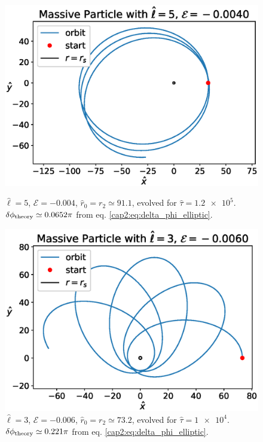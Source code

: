 \begin{figure}[h]
    \begin{minipage}{0.48 \textwidth}
        \centering
        \includegraphics[width=\textwidth]{Figures/chapter2/prec1.eps}
        \caption{$\hat \ell = 5$, $\mathcal E = -0.004$,
        $\hat r_0 = r_2 \simeq 91.1$, evolved for $\hat \tau = \num{1.2e5}$. \\
        $\delta \phi_{\rm theory} \simeq 0.0652 \pi$ from eq.
        \ref{cap2:eq:delta_phi_elliptic}.}
        \label{cap2:fig:prec1}
    \end{minipage}
    \hspace{0.015 \textwidth}
    \begin{minipage}{0.48 \textwidth}
        \centering
        \includegraphics[width=\textwidth]{Figures/chapter2/prec2.eps}
        \caption{$\hat \ell = 3$, $\mathcal E = -0.006$,
        $\hat r_0 = r_2 \simeq 73.2$, evolved for $\hat \tau = \num{1e4}$. \\
        $\delta \phi_{\rm theory} \simeq 0.221 \pi$ from eq.
        \ref{cap2:eq:delta_phi_elliptic}.}
        \label{cap2:fig:prec2}
    \end{minipage}
\end{figure}


